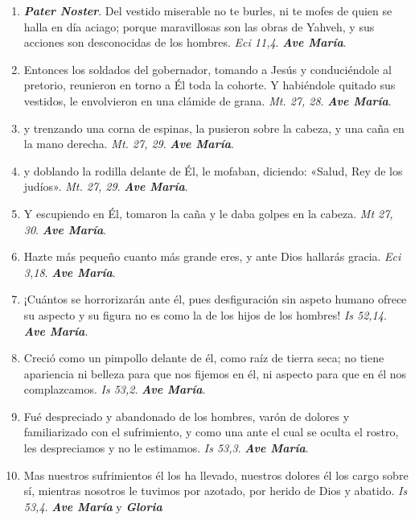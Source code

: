 \documentclass[../../devocionario.tex]{subfiles}
\begin{document}
    \begin{enumerate}
    
        \item \textbf{\emph{Pater Noster}}. Del vestido miserable no te burles, ni te mofes de quien se halla en día aciago; 
            porque maravillosas son las obras de Yahveh, y sus acciones son desconocidas de los hombres. \emph{Eci 11,4}. \textbf{\emph{Ave María}}.

        \item Entonces los soldados del gobernador, tomando a Jesús y conduciéndole al pretorio, reunieron en torno a Él toda la cohorte. 
            Y habiéndole quitado sus vestidos, le envolvieron en una clámide de grana. \emph{Mt. 27, 28}. \textbf{\emph{Ave María}}.

        \item y trenzando una corna de espinas, la pusieron sobre la cabeza, y una caña en la mano derecha. \emph{Mt. 27, 29}. \textbf{\emph{Ave María}}.

        \item y doblando la rodilla delante de Él, le mofaban, diciendo: «Salud, Rey de los judíos». \emph{Mt. 27, 29}. \textbf{\emph{Ave María}}.

        \item Y escupiendo en Él, tomaron la caña y le daba golpes en la cabeza. \emph{Mt 27, 30}. \textbf{\emph{Ave María}}.

        \item Hazte más pequeño cuanto más grande eres, y ante Dios hallarás gracia. \emph{Eci 3,18}. \textbf{\emph{Ave María}}.

        \item ¡Cuántos se horrorizarán ante él, pues desfiguración sin aspeto humano ofrece su aspecto y su figura 
            no es como la de los hijos de los hombres! \emph{Is 52,14}. \textbf{\emph{Ave María}}.

        \item Creció como un pimpollo delante de él, como raíz de tierra seca; no tiene apariencia ni belleza para 
            que nos fijemos en él, ni aspecto para que en él nos complazcamos. \emph{Is 53,2}. \textbf{\emph{Ave María}}.

        \item Fué despreciado y abandonado de los hombres, varón de dolores y familiarizado con el sufrimiento, 
            y como una ante el cual se oculta el rostro, les despreciamos y no le estimamos. \emph{Is 53,3}. \textbf{\emph{Ave María}}.

        \item Mas nuestros sufrimientos él los ha llevado, nuestros dolores él los cargo sobre sí, 
            mientras nosotros le tuvimos por azotado, por herido de Dios y abatido. \emph{Is 53,4}. \textbf{\emph{Ave María}} y \textbf{\emph{Gloria}}

    \end{enumerate}
\end{document}
